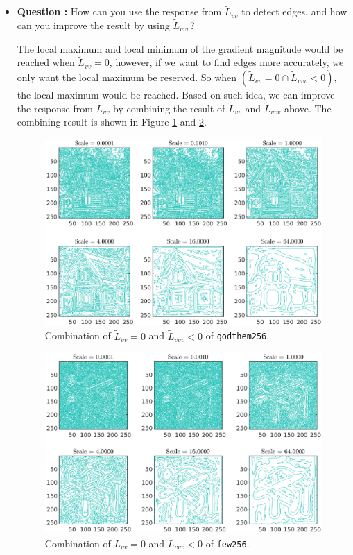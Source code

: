 \documentclass[11pt,a4paper]{article}
\begin{document}
\begin{itemize}
		\item\addtocounter{Counter}{1}\textbf{Question :} How can you use the response from $\widetilde{L}_{vv}$ to detect edges, and how can you improve the result by using $\widetilde{L}_{vvv}$?
			\par The local maximum and local minimum of the gradient magnitude would be reached when $\widetilde{L}_{vv}=0$, however, if we want to find edges more accurately, we only want the local maximum be reserved. So when $(\widetilde{L}_{vv}=0 \cap \widetilde{L}_{vvv}<0)$, the local maximum would be reached. Based on such idea, we can improve the response from $\widetilde{L}_{vv}$ by combining the result of $\widetilde{L}_{vv}$ and $\widetilde{L}_{vvv}$ above. The combining result is shown in Figure \ref{fig:Question_6_House_Lvv_Lvvv} and \ref{fig:Question_6_Tools_Lvv_Lvvv}.
			\begin{figure}[!ht]
				\centering
				\includegraphics[width=0.9\columnwidth]{Question_6_House_Lvv_Lvvv.eps}
				\caption{Combination of $\widetilde{L}_{vv}=0$ and $\widetilde{L}_{vvv}<0$ of \texttt{godthem256}.}
				\label{fig:Question_6_House_Lvv_Lvvv}
			\end{figure}
			\begin{figure}[!ht]
				\centering
				\includegraphics[width=0.9\columnwidth]{Question_6_Tools_Lvv_Lvvv.eps}
				\caption{Combination of $\widetilde{L}_{vv}=0$ and $\widetilde{L}_{vvv}<0$ of \texttt{few256}.}
				\label{fig:Question_6_Tools_Lvv_Lvvv}
			\end{figure}
	\end{itemize}
\end{document}

